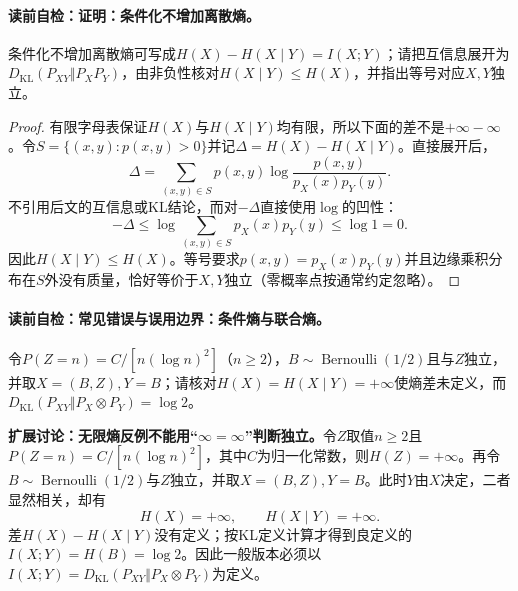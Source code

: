 \paragraph{读前自检：证明：条件化不增加离散熵。}条件化不增加离散熵可写成$H(X)-H(X\mid Y)=I(X;Y)$；请把互信息展开为$D_{\mathrm{KL}}(P_{XY}\Vert P_XP_Y)$，由非负性核对$H(X\mid Y)\le H(X)$，并指出等号对应$X,Y$独立。\par

\begin{proof}
有限字母表保证$H(X)$与$H(X\mid Y)$均有限，所以下面的差不是$+\infty-\infty$。令$S=\{(x,y):p(x,y)>0\}$并记$\Delta=H(X)-H(X\mid Y)$。直接展开后，
\[
\Delta=\sum_{(x,y)\in S}p(x,y)
\log\frac{p(x,y)}{p_X(x)p_Y(y)}.
\]
不引用后文的互信息或KL结论，而对$-\Delta$直接使用$\log$的凹性：
\[
-\Delta
\le\log\!\sum_{(x,y)\in S}p_X(x)p_Y(y)
\le\log1=0.
\]
因此$H(X\mid Y)\le H(X)$。等号要求$p(x,y)=p_X(x)p_Y(y)$并且边缘乘积分布在$S$外没有质量，恰好等价于$X,Y$独立（零概率点按通常约定忽略）。
\end{proof}

\paragraph{读前自检：常见错误与误用边界：条件熵与联合熵。}令$P(Z=n)=C/[n(\log n)^2]$（$n\ge2$），$B\sim\operatorname{Bernoulli}(1/2)$且与$Z$独立，并取$X=(B,Z),Y=B$；请核对$H(X)=H(X\mid Y)=+\infty$使熵差未定义，而$D_{\mathrm{KL}}(P_{XY}\Vert P_X\otimes P_Y)=\log2$。\par

\begin{warningbox}
\textbf{扩展讨论：无限熵反例不能用“$\infty=\infty$”判断独立。}令$Z$取值$n\ge2$且$P(Z=n)=C/[n(\log n)^2]$，其中$C$为归一化常数，则$H(Z)=+\infty$。再令$B\sim\operatorname{Bernoulli}(1/2)$与$Z$独立，并取$X=(B,Z),Y=B$。此时$Y$由$X$决定，二者显然相关，却有
\[
H(X)=+\infty,
\qquad
H(X\mid Y)=+\infty.
\]
差$H(X)-H(X\mid Y)$没有定义；按KL定义计算才得到良定义的$I(X;Y)=H(B)=\log2$。因此一般版本必须以$I(X;Y)=D_{\mathrm{KL}}(P_{XY}\Vert P_X\otimes P_Y)$为定义。
\end{warningbox}



